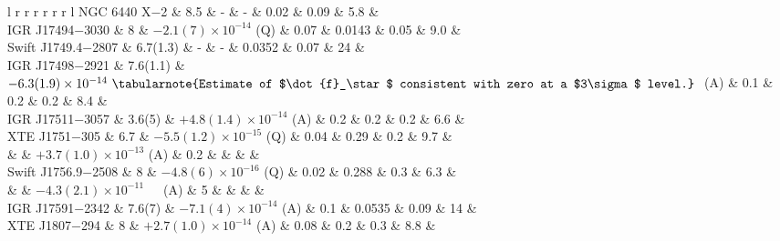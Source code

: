 \begin{landscape}
\begin{table}
{\begin{NiceTabular}{l r r r r r r l}
NGC 6440 X$-$2      	& \textrm{8.5}  & -  						   			    	& -				& 0.02  	& 0.09  & 5.8  &\cite{Harris2010, Bult2015} \\
IGR J17494$-$3030     	& \textrm{8} 	 & $-2.1(7)\times 10^{-14} $ (Q)  				& 0.07			& 0.0143  	& 0.05  & 9.0  &\cite{Ng2021} \\
Swift J1749.4$-$2807	& \textrm{6.7(1.3)} 	 & -  						   			    	& -				& 0.0352  	& 0.07  & 24   &\cite{Wijnands2009, Bult2021a, Sanna2022} \\
IGR J17498$-$2921   	& \textrm{7.6(1.1)}  	 & $-6.3(1.9)\times 10^{-14}\ \tabularnote{Estimate of $\dot{f}_\star$ consistent with zero at a $3\sigma$ level.}\ $ (A) 	& 0.1 			& 0.2  		& 0.2   & 8.4  &\cite{Linares2011, Papitto17498, Falanga2012} \\
IGR J17511$-$3057   	& \textrm{3.6(5)} 		 & $+4.8(1.4)\times 10^{-14} $ (A)  			& 0.2	& 0.2  		& 0.2   & 6.6  &\cite{Riggio17511} \\
XTE J1751$-$305     	& \textrm{6.7}  & $-5.5(1.2)\times 10^{-15}$  (Q)  			& 0.04			& 0.29  	& 0.2   & 9.7  &\cite{Watts2008, Papitto1751, Riggio2011} \\
						& 						 & $+3.7(1.0)\times 10^{-13}$  (A)  			& 0.2	& 		  	& 	    &      & \\
Swift J1756.9$-$2508	& \textrm{8} 	 & $-4.8(6)\times 10^{-16}$  (Q)  				& 0.02			& 0.288  	& 0.3   & 6.3  &\cite{Watts2008, Sanna1756} \\
						& 					 	 & $-4.3(2.1)\times 10^{-11}$\ \ \ (A) & 5				& 		  	& 	    &      & \\
IGR J17591$-$2342   	& \textrm{7.6(7)} 		 & $-7.1(4)\times 10^{-14} $ (A)  				& 0.1			& 0.0535  	& 0.09  & 14   &\cite{Gusinskaia2020, Kuiper2020, Sanna17591} \\
XTE J1807$-$294     	& \textrm{8} 	 & $+2.7(1.0)\times 10^{-14}$  (A)  			& 0.08	& 0.2  		& 0.3   & 8.8  &\cite{Watts2008, Riggio2008, Patruno1807} \\

\end{NiceTabular}}
\end{table}
\end{landscape}
